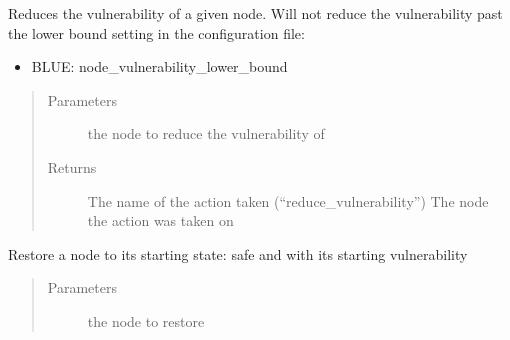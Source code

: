 \documentclass[letterpaper,10pt,english]{sphinxmanual}
\begin{document}
\begin{fulllineitems}

\begin{fulllineitems}
\label{\detokenize{source/yawning_titan.envs.generic.core:yawning_titan.envs.generic.core.blue_action_set.BlueActionSet.reduce_node_vulnerability}}
\sphinxAtStartPar
Reduces the vulnerability of a given node. Will not reduce the vulnerability past the lower bound setting in the
configuration file:
\begin{itemize}
\item {}
\sphinxAtStartPar
BLUE: node\_vulnerability\_lower\_bound

\end{itemize}
\begin{quote}\begin{description}
\item[{Parameters}] \leavevmode
\sphinxAtStartPar
{} \textendash{} the node to reduce the vulnerability of

\item[{Returns}] \leavevmode
\sphinxAtStartPar
The name of the action taken (“reduce\_vulnerability”)
The node the action was taken on

\end{description}\end{quote}

\end{fulllineitems}


\begin{fulllineitems}
\label{\detokenize{source/yawning_titan.envs.generic.core:yawning_titan.envs.generic.core.blue_action_set.BlueActionSet.restore_node}}
\sphinxAtStartPar
Restore a node to its starting state: safe and with its starting vulnerability
\begin{quote}\begin{description}
\item[{Parameters}] \leavevmode
\sphinxAtStartPar
{} \textendash{} the node to restore


\end{description}
\end{quote}
\end{fulllineitems}
\end{fulllineitems}
\end{document}
